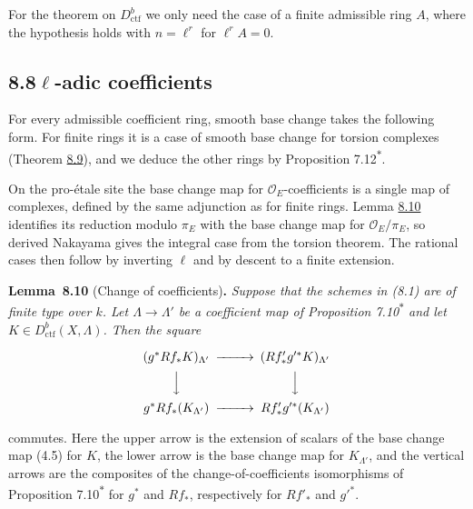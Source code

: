 \documentclass[11pt]{article}
\newenvironment{bpstatement}[2]{\par\addvspace{0.6\baselineskip}\noindent\textbf{#1}#2\textbf{.}\enspace\ignorespaces}
  {\par\addvspace{0.4\baselineskip}}
\newenvironment{bpstatementit}[2]{\begin{bpstatement}{#1}{#2}\itshape\ignorespaces}{\end{bpstatement}}
\newcommand{\bpout}[1]{#1\textsuperscript{\hyperlink{bp-outside}{\ensuremath{\ast}}}}
\begin{document}
\label{bp40}%
For the theorem on \(D^b_{\mathrm{ctf}}\) we only need the case of a finite admissible ring \(A\), where the hypothesis holds with \(n=\ell^r\) for \(\ell^rA=0\).


\subsection*{\texorpdfstring{8.8\quad $\ell$-adic coefficients}{8.8 ell-adic coefficients}}
\label{bp41}%
\label{bp42}%
For every admissible coefficient ring, smooth base change takes the following form. For finite rings it is a case of smooth base change for torsion complexes (Theorem \hyperref[bp38]{8.9}), and we deduce the other rings by Proposition \bpout{7.12}.

On the pro-étale site the base change map for \(\mathcal O_E\)-coefficients is a single map of complexes, defined by the same adjunction as for finite rings. Lemma \hyperref[bp43]{8.10} identifies its reduction modulo \(\pi_E\) with the base change map for \(\mathcal O_E/\pi_E\), so derived Nakayama gives the integral case from the torsion theorem. The rational cases then follow by inverting \(\ell\) and by descent to a finite extension.

\label{bp43}%
\begin{bpstatementit}{Lemma~8.10}{ (Change of coefficients)}
Suppose that the schemes in (8.1) are of finite type over \(k\). Let \(\Lambda\to\Lambda'\) be a coefficient map of Proposition \bpout{7.10} and let \(K\in D^b_{\mathrm{ctf}}(X,\Lambda)\). Then the square

\[
\begin{CD}
(g^*Rf_*K)_{\Lambda'} @>>> (Rf'_*g'^*K)_{\Lambda'}\\
@VVV @VVV\\
g^*Rf_*(K_{\Lambda'}) @>>> Rf'_*g'^*(K_{\Lambda'})
\end{CD}
\]

commutes. Here the upper arrow is the extension of scalars of the base change map (4.5) for \(K\), the lower arrow is the base change map for \(K_{\Lambda'}\), and the vertical arrows are the composites of the change-of-coefficients isomorphisms of Proposition \bpout{7.10} for \(g^*\) and \(Rf_*\), respectively for \(Rf'_*\) and \(g'^*\).
\end{bpstatementit}
\end{document}
